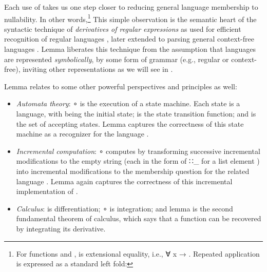 \documentclass[acmsmall,screen,anonymous,timestamp]{acmart}
\begin{document}
Each use of  takes us one step closer to reducing general language membership to nullability.
In other words,\footnote{For functions  and , {  } is extensional equality, i.e., {\AS ∀ \AB x \AS →     }.
Repeated application is expressed as a standard left fold:
\vspace{-2ex}
}%
This simple observation is the semantic heart of the syntactic technique of \emph{derivatives of regular expressions} as used for efficient recognition of regular languages \citep{Brzozowski64}, later extended to parsing general context-free languages \citep{Might2010YaccID}.
Lemma  liberates this technique from the assumption that languages are represented \emph{symbolically}, by some form of grammar (e.g., regular or context-free), inviting other representations as we will see in .

Lemma  relates to some other powerful perspectives and principles as well:
\begin{itemize}

\item 
\emph{Automata theory}: { \AF ∘   } is the execution of a state machine.
Each state is a language, with  being the initial state;  is the state transition function; and  is the set of accepting states\out{ \needcite{}}.
Lemma  captures the correctness of this state machine as a recognizer for the language .

\item
\emph{Incremental computation}: { \AF ∘   } computes  by transforming successive incremental modifications to the empty string (each in the form of { \AIC ∷\_} for a list element ) into incremental modifications to the membership question for the related language {  }\out{ \needcite{}}.
Lemma  again captures the correctness of this incremental implementation of .

\item 
\emph{Calculus}:  is differentiation; { \AF ∘   } is integration; and lemma  is the second fundamental theorem of calculus, which says that a function can be recovered by integrating its derivative\out{ \needcite{}}.

\end{itemize}
\end{document}
